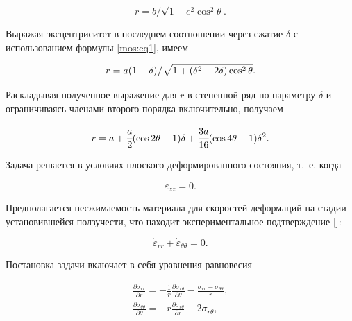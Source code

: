 $$r=b \big/\sqrt{1-e^2\cos^2{\theta}}. $$

Выражая эксцентриситет в последнем соотношении через сжатие $\delta$ с использованием формулы \eqref{mos:eq1}, имеем

$$r=a(1-\delta)\big{/}\sqrt{1+(\delta^2-2\delta)\cos^2\theta}.  $$



Раскладывая полученное выражение для $r$ в степенной ряд по параметру $\delta$ и ограничиваясь членами второго порядка включительно, получаем

\begin{equation}

\label{mos:eq2}

r=a+\cfrac a2( \cos {2\theta}-1)\delta +\cfrac {3a}{16}(\cos {4\theta}-1)\delta^2 .

\end{equation}

Задача решается в условиях плоского деформированного состояния, т.~е. когда

\begin{equation}

\label{mos:eq3}

\dot{\varepsilon}_{zz}=0 .

\end{equation}

Предполагается несжимаемость материала для скоростей деформаций на стадии установившейся ползучести, что находит экспериментальное подтверждение []:

\begin{equation}

\label{mos:eq4}

\dot{\varepsilon}_{rr} + \dot{\varepsilon}_{\theta \theta}=0.

\end{equation}



 Постановка задачи включает в себя уравнения равновесия

\begin{gather}

\label{mos:eq5}

\frac{\partial \sigma_{rr}}{\partial r} = -\frac{1}{r} \frac{\partial\sigma_{r\theta}}{\partial \theta} - \frac{\sigma_{rr}-\sigma_{\theta\theta}}{r} ,

\\

\label{mos:eq6}

\frac{\partial\sigma_{\theta\theta}}{\partial \theta} =-r \frac{\partial\sigma_{r\theta}}{\partial r} -2 \sigma_{r\theta} ,

\end{gather}

